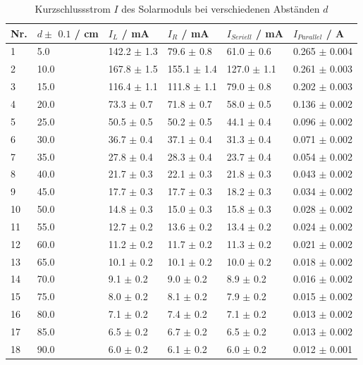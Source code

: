\documentclass[12pt,a4paper,twoside]{article}
\begin{document}
\begin{table}[H]
    \centering
    \caption{Kurzschlussstrom $I$ des Solarmoduls bei verschiedenen Abständen $d$}
    \label{tab:Messdaten Strom Solar}
    \begin{tabular}{| l | l | l | l | l | l |}
        \hline
        Nr. & $d \pm $ $0.1 $ / cm & $I_{L}$ / mA & $I_{R}$ / mA & $I_{Seriell}$ / mA & $I_{Parallel}$ / A \\
        \hline
        1  & 5.0  & 142.2 $\pm$ 1.3  & 79.6  $\pm$ 0.8 & 61.0  $\pm$ 0.6 & 0.265 $\pm$ 0.004  \\
        2  & 10.0 & 167.8 $\pm$ 1.5  & 155.1 $\pm$ 1.4 & 127.0 $\pm$ 1.1 & 0.261 $\pm$ 0.003  \\
        3  & 15.0 & 116.4 $\pm$ 1.1  & 111.8 $\pm$ 1.1 & 79.0  $\pm$ 0.8 & 0.202 $\pm$ 0.003  \\
        4  & 20.0 &  73.3 $\pm$ 0.7  & 71.8  $\pm$ 0.7 & 58.0  $\pm$ 0.5 & 0.136 $\pm$ 0.002  \\
        5  & 25.0 &  50.5 $\pm$ 0.5  & 50.2  $\pm$ 0.5 & 44.1  $\pm$ 0.4 & 0.096 $\pm$ 0.002  \\
        6  & 30.0 &  36.7 $\pm$ 0.4  & 37.1  $\pm$ 0.4 & 31.3  $\pm$ 0.4 & 0.071 $\pm$ 0.002  \\
        7  & 35.0 &  27.8 $\pm$ 0.4  & 28.3  $\pm$ 0.4 & 23.7  $\pm$ 0.4 & 0.054 $\pm$ 0.002  \\
        8  & 40.0 &  21.7 $\pm$ 0.3  & 22.1  $\pm$ 0.3 & 21.8  $\pm$ 0.3 & 0.043 $\pm$ 0.002  \\
        9  & 45.0 &  17.7 $\pm$ 0.3  & 17.7  $\pm$ 0.3 & 18.2  $\pm$ 0.3 & 0.034 $\pm$ 0.002  \\
        10 & 50.0 &  14.8 $\pm$ 0.3  & 15.0  $\pm$ 0.3 & 15.8  $\pm$ 0.3 & 0.028 $\pm$ 0.002  \\
        11 & 55.0 &  12.7 $\pm$ 0.2  & 13.6  $\pm$ 0.2 & 13.4  $\pm$ 0.2 & 0.024 $\pm$ 0.002  \\
        12 & 60.0 &  11.2 $\pm$ 0.2  & 11.7  $\pm$ 0.2 & 11.3  $\pm$ 0.2 & 0.021 $\pm$ 0.002  \\
        13 & 65.0 &  10.1 $\pm$ 0.2  & 10.1  $\pm$ 0.2 & 10.0  $\pm$ 0.2 & 0.018 $\pm$ 0.002  \\
        14 & 70.0 &   9.1 $\pm$ 0.2  & 9.0   $\pm$ 0.2 & 8.9   $\pm$ 0.2 & 0.016 $\pm$ 0.002  \\
        15 & 75.0 &   8.0 $\pm$ 0.2  & 8.1   $\pm$ 0.2 & 7.9   $\pm$ 0.2 & 0.015 $\pm$ 0.002  \\
        16 & 80.0 &   7.1 $\pm$ 0.2  & 7.4   $\pm$ 0.2 & 7.1   $\pm$ 0.2 & 0.013 $\pm$ 0.002  \\
        17 & 85.0 &   6.5 $\pm$ 0.2  & 6.7   $\pm$ 0.2 & 6.5   $\pm$ 0.2 & 0.013 $\pm$ 0.002  \\
        18 & 90.0 &   6.0 $\pm$ 0.2  & 6.1   $\pm$ 0.2 & 6.0   $\pm$ 0.2 & 0.012 $\pm$ 0.001  \\
        \hline  
    \end{tabular}
\end{table}
\end{document}
